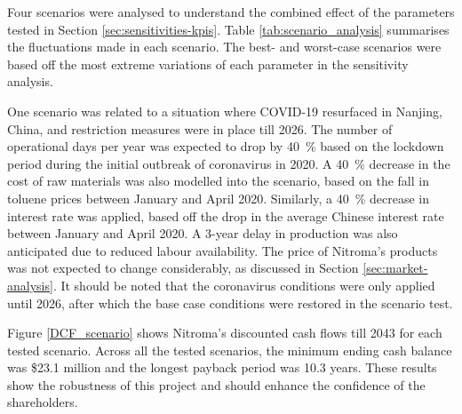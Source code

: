 Four scenarios were analysed to understand the combined effect of the parameters tested in Section \ref{sec:sensitivities-kpis}. Table \ref{tab:scenario_analysis} summarises the fluctuations made in each scenario. The best- and worst-case scenarios were based off the most extreme variations of each parameter in the sensitivity analysis. 

One scenario was related to a situation where COVID-19 resurfaced in Nanjing, China, and restriction measures were in place till 2026. The number of operational days per year was expected to drop by \SI{40}{\percent} based on the lockdown period during the initial outbreak of coronavirus in 2020. A \SI{40}{\percent} decrease in the cost of raw materials was also modelled into the scenario, based on the fall in toluene prices between January and April 2020. Similarly, a \SI{40}{\percent} decrease in interest rate was applied, based off the drop in the average Chinese interest rate between January and April 2020. A 3-year delay in production was also anticipated due to reduced labour availability. The price of Nitroma’s products was not expected to change considerably, as discussed in Section \ref{sec:market-analysis}. It should be noted that the coronavirus conditions were only applied until 2026, after which the base case conditions were restored in the scenario test.

Figure \ref{DCF_scenario} shows Nitroma’s discounted cash flows till 2043 for each tested scenario. Across all the tested scenarios, the minimum ending cash balance was \$23.1 million and the longest payback period was 10.3 years. These results show the robustness of this project and should enhance the confidence of the shareholders.
